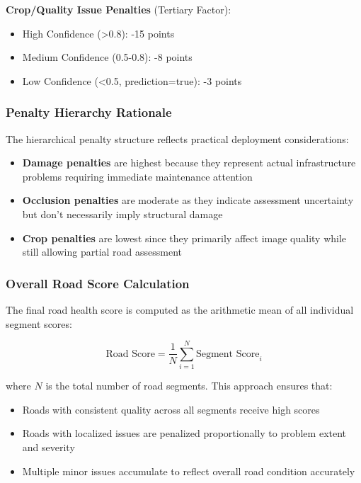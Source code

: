\documentclass[12pt]{article}
\begin{document}
\textbf{Crop/Quality Issue Penalties} (Tertiary Factor):
\begin{itemize}[itemsep=1pt,parsep=0pt,topsep=2pt]
\item High Confidence (>0.8): -15 points
\item Medium Confidence (0.5-0.8): -8 points
\item Low Confidence (<0.5, prediction=true): -3 points
\end{itemize}

\subsubsection{Penalty Hierarchy Rationale}

The hierarchical penalty structure reflects practical deployment considerations:

\begin{itemize}[itemsep=1pt,parsep=0pt,topsep=3pt]
\item \textbf{Damage penalties} are highest because they represent actual infrastructure problems requiring immediate maintenance attention
\item \textbf{Occlusion penalties} are moderate as they indicate assessment uncertainty but don't necessarily imply structural damage
\item \textbf{Crop penalties} are lowest since they primarily affect image quality while still allowing partial road assessment
\end{itemize}

\subsubsection{Overall Road Score Calculation}

The final road health score is computed as the arithmetic mean of all individual segment scores:

\begin{equation}
\text{Road Score} = \frac{1}{N} \sum_{i=1}^{N} \text{Segment Score}_i
\end{equation}

where $N$ is the total number of road segments. This approach ensures that:
\begin{itemize}[itemsep=1pt,parsep=0pt,topsep=2pt]
\item Roads with consistent quality across all segments receive high scores
\item Roads with localized issues are penalized proportionally to problem extent and severity
\item Multiple minor issues accumulate to reflect overall road condition accurately
\end{itemize}
\end{document}
